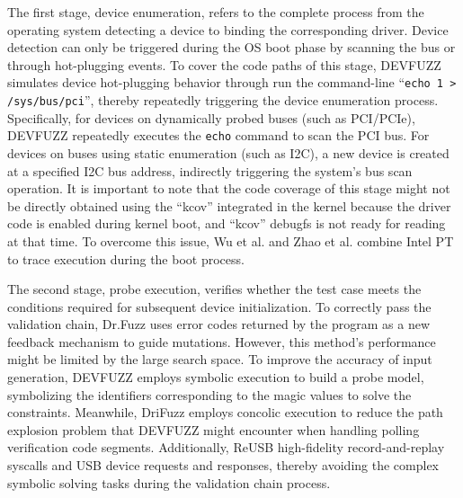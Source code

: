 The first stage, device enumeration, refers to the complete process from the operating system detecting a device to binding the corresponding driver. Device detection can only be triggered during the OS boot phase by scanning the bus or through hot-plugging events. To cover the code paths of this stage, DEVFUZZ \cite{wu2023devfuzz} simulates device hot-plugging behavior through run the command-line ``\texttt{echo 1 > /sys/bus/pci}'', thereby repeatedly triggering the device enumeration process. Specifically, for devices on dynamically probed buses (such as PCI/PCIe), DEVFUZZ repeatedly executes the \texttt{echo} command to scan the PCI bus. For devices on buses using static enumeration (such as I2C), a new device is created at a specified I2C bus address, indirectly triggering the system's bus scan operation. It is important to note that the code coverage of this stage might not be directly obtained using the ``kcov'' integrated in the kernel because the driver code is enabled during kernel boot, and ``kcov'' debugfs is not ready for reading at that time. To overcome this issue, Wu et al. and Zhao et al. \cite{zhao2022semantic,wu2023devfuzz} combine Intel PT to trace execution during the boot process.

The second stage, probe execution, verifies whether the test case meets the conditions required for subsequent device initialization.  To correctly pass the validation chain, Dr.Fuzz \cite{zhao2022semantic} uses error codes returned by the program as a new feedback mechanism to guide mutations. However, this method's performance might be limited by the large search space. To improve the accuracy of input generation, DEVFUZZ \cite{wu2023devfuzz} employs symbolic execution to build a probe model, symbolizing the identifiers corresponding to the magic values to solve the constraints. Meanwhile, DriFuzz \cite{shen2022drifuzz} employs concolic execution to reduce the path explosion problem that DEVFUZZ \cite{wu2023devfuzz} might encounter when handling polling verification code segments. Additionally, ReUSB \cite{Jang2023ReUSB} high-fidelity record-and-replay syscalls and USB device requests and responses, thereby avoiding the complex symbolic solving tasks during the validation chain process.


